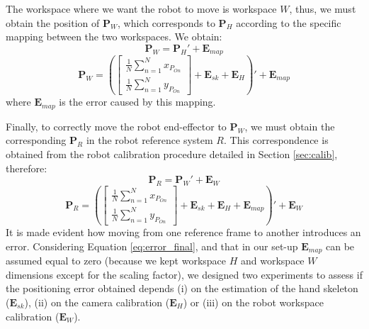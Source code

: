 \documentclass[a4paper, 10pt, conference]{ieeeconf}      %
\begin{document}
The workspace where we want the robot to move is workspace $W$, thus, we must obtain the position of $\mathbf{P}_W$, which corresponds to $\mathbf{P}_H$ according to the specific mapping between the two workspaces. We obtain:
\begin{equation}
\mathbf{P}_W = \mathbf{P}_H' + \mathbf{E}_{map}
\end{equation}
\begin{equation}
\mathbf{P}_W = \left(\begin{bmatrix}
\frac{1}{N}\sum_{n=1}^{N}x_{P_{On}} \\
\frac{1}{N}\sum_{n=1}^{N}y_{P_{On}}
\end{bmatrix} + \mathbf{E}_{sk} + \mathbf{E}_{H}\right)' + \mathbf{E}_{map}
\end{equation}
where $\mathbf{E}_{map}$ is the error caused by this mapping.

Finally, to correctly move the robot end-effector to $\mathbf{P}_W$, we must obtain the corresponding $\mathbf{P}_R$ in the robot reference system $R$. This correspondence is obtained from the robot calibration procedure detailed in Section \ref{sec:calib}, therefore: 
\begin{equation}
\mathbf{P}_R = \mathbf{P}_W' + \mathbf{E}_W
\end{equation}
\begin{equation}\label{eq:error_final}
\mathbf{P}_R = \left(\begin{bmatrix}
\frac{1}{N}\sum_{n=1}^{N}x_{P_{On}} \\
\frac{1}{N}\sum_{n=1}^{N}y_{P_{On}}
\end{bmatrix} + \mathbf{E}_{sk} + \mathbf{E}_{H} + \mathbf{E}_{map} \right)' + \mathbf{E}_W
\end{equation}
It is made evident how moving from one reference frame to another introduces an error. Considering Equation \ref{eq:error_final}, and that in our set-up $\mathbf{E}_{map}$ can be assumed equal to zero (because we kept workspace $H$ and workspace $W$ dimensions except for the scaling factor), we designed two experiments to assess if the positioning error obtained depends (i) on the estimation of the hand skeleton ($\mathbf{E}_{sk}$), (ii) on the camera calibration ($\mathbf{E}_{H}$) or (iii) on the robot workspace calibration ($\mathbf{E}_{W}$).
\end{document}
